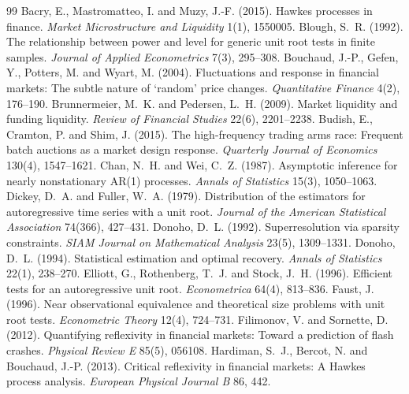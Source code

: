 \documentclass[12pt]{article}
\theoremstyle{definition}
\theoremstyle{remark}
\begin{document}
\begin{thebibliography}{99}
 Bacry, E., Mastromatteo, I. and Muzy, J.-F. (2015). Hawkes processes in finance. \emph{Market Microstructure and Liquidity} 1(1), 1550005.
 Blough, S.~R. (1992). The relationship between power and level for generic unit root tests in finite samples. \emph{Journal of Applied Econometrics} 7(3), 295--308.
 Bouchaud, J.-P., Gefen, Y., Potters, M. and Wyart, M. (2004). Fluctuations and response in financial markets: The subtle nature of `random' price changes. \emph{Quantitative Finance} 4(2), 176--190.
 Brunnermeier, M.~K. and Pedersen, L.~H. (2009). Market liquidity and funding liquidity. \emph{Review of Financial Studies} 22(6), 2201--2238.
 Budish, E., Cramton, P. and Shim, J. (2015). The high-frequency trading arms race: Frequent batch auctions as a market design response. \emph{Quarterly Journal of Economics} 130(4), 1547--1621.
 Chan, N.~H. and Wei, C.~Z. (1987). Asymptotic inference for nearly nonstationary AR(1) processes. \emph{Annals of Statistics} 15(3), 1050--1063.
 Dickey, D.~A. and Fuller, W.~A. (1979). Distribution of the estimators for autoregressive time series with a unit root. \emph{Journal of the American Statistical Association} 74(366), 427--431.
 Donoho, D.~L. (1992). Superresolution via sparsity constraints. \emph{SIAM Journal on Mathematical Analysis} 23(5), 1309--1331.
 Donoho, D.~L. (1994). Statistical estimation and optimal recovery. \emph{Annals of Statistics} 22(1), 238--270.
 Elliott, G., Rothenberg, T.~J. and Stock, J.~H. (1996). Efficient tests for an autoregressive unit root. \emph{Econometrica} 64(4), 813--836.
 Faust, J. (1996). Near observational equivalence and theoretical size problems with unit root tests. \emph{Econometric Theory} 12(4), 724--731.
 Filimonov, V. and Sornette, D. (2012). Quantifying reflexivity in financial markets: Toward a prediction of flash crashes. \emph{Physical Review E} 85(5), 056108.
 Hardiman, S.~J., Bercot, N. and Bouchaud, J.-P. (2013). Critical reflexivity in financial markets: A Hawkes process analysis. \emph{European Physical Journal B} 86, 442.

\end{thebibliography}
\end{document}
